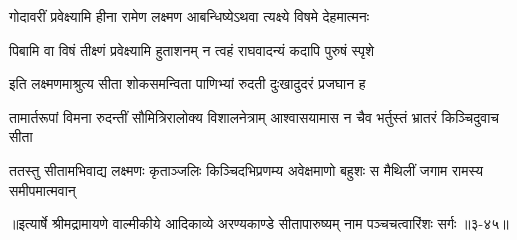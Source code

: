 \twolineshloka
{गोदावरीं प्रवेक्ष्यामि हीना रामेण लक्ष्मण}
{आबन्धिष्येऽथवा त्यक्ष्ये विषमे देहमात्मनः} %

\twolineshloka
{पिबामि वा विषं तीक्ष्णं प्रवेक्ष्यामि हुताशनम्}
{न त्वहं राघवादन्यं कदापि पुरुषं स्पृशे} %

\twolineshloka
{इति लक्ष्मणमाश्रुत्य सीता शोकसमन्विता}
{पाणिभ्यां रुदती दुःखादुदरं प्रजघान ह} %

\twolineshloka
{तामार्तरूपां विमना रुदन्तीं सौमित्रिरालोक्य विशालनेत्राम्}
{आश्वासयामास न चैव भर्तुस्तं भ्रातरं किञ्चिदुवाच सीता} %

\twolineshloka
{ततस्तु सीतामभिवाद्य लक्ष्मणः कृताञ्जलिः किञ्चिदभिप्रणम्य}
{अवेक्षमाणो बहुशः स मैथिलीं जगाम रामस्य समीपमात्मवान्} %


॥इत्यार्षे श्रीमद्रामायणे वाल्मीकीये आदिकाव्ये अरण्यकाण्डे सीतापारुष्यम् नाम पञ्चचत्वारिंशः सर्गः ॥३-४५॥
